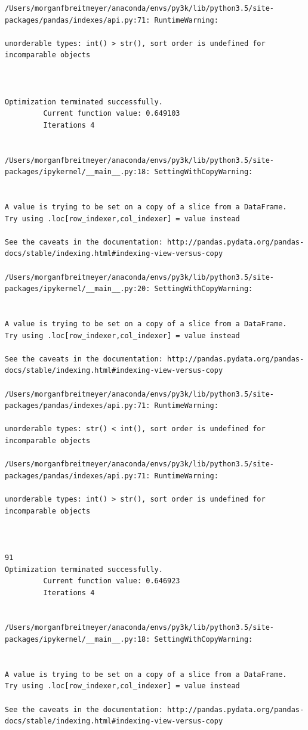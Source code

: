 \begin{lstlisting}
/Users/morganfbreitmeyer/anaconda/envs/py3k/lib/python3.5/site-packages/pandas/indexes/api.py:71: RuntimeWarning:

unorderable types: int() > str(), sort order is undefined for incomparable objects



Optimization terminated successfully.
         Current function value: 0.649103
         Iterations 4


/Users/morganfbreitmeyer/anaconda/envs/py3k/lib/python3.5/site-packages/ipykernel/__main__.py:18: SettingWithCopyWarning:


A value is trying to be set on a copy of a slice from a DataFrame.
Try using .loc[row_indexer,col_indexer] = value instead

See the caveats in the documentation: http://pandas.pydata.org/pandas-docs/stable/indexing.html#indexing-view-versus-copy

/Users/morganfbreitmeyer/anaconda/envs/py3k/lib/python3.5/site-packages/ipykernel/__main__.py:20: SettingWithCopyWarning:


A value is trying to be set on a copy of a slice from a DataFrame.
Try using .loc[row_indexer,col_indexer] = value instead

See the caveats in the documentation: http://pandas.pydata.org/pandas-docs/stable/indexing.html#indexing-view-versus-copy

/Users/morganfbreitmeyer/anaconda/envs/py3k/lib/python3.5/site-packages/pandas/indexes/api.py:71: RuntimeWarning:

unorderable types: str() < int(), sort order is undefined for incomparable objects

/Users/morganfbreitmeyer/anaconda/envs/py3k/lib/python3.5/site-packages/pandas/indexes/api.py:71: RuntimeWarning:

unorderable types: int() > str(), sort order is undefined for incomparable objects



91
Optimization terminated successfully.
         Current function value: 0.646923
         Iterations 4


/Users/morganfbreitmeyer/anaconda/envs/py3k/lib/python3.5/site-packages/ipykernel/__main__.py:18: SettingWithCopyWarning:


A value is trying to be set on a copy of a slice from a DataFrame.
Try using .loc[row_indexer,col_indexer] = value instead

See the caveats in the documentation: http://pandas.pydata.org/pandas-docs/stable/indexing.html#indexing-view-versus-copy


\end{lstlisting}
